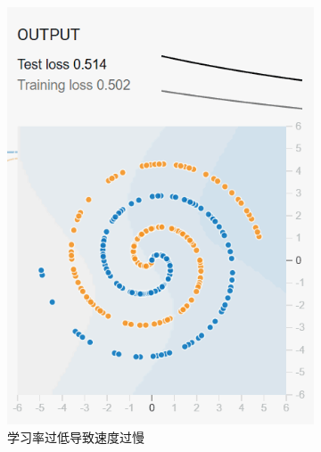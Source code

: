 \documentclass[printMode=false, declarePage=false]{ecnuthesis}
\begin{document}
    \begin{figure}[htbp]
        \centering
        \begin{subfigure}[b]{0.3\textwidth}
            \centering
            \includegraphics[width=\textwidth]{too-slow-000001.png}
            \caption{学习率过低导致速度过慢}
            \label{fig:step021}
        \end{subfigure}
        \hfill
        \begin{subfigure}[b]{0.3\textwidth}
            \centering

\end{subfigure}
\end{figure}
\end{document}

